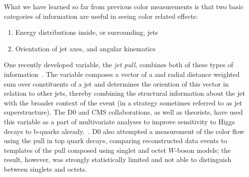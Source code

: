 What we have learned so far from previous color measurements is that two basic categories of information are useful in seeing color related effects:
%
\begin{enumerate}
\item Energy distributions inside, or surrounding, jets
\item Orientation of jet axes, and angular kinematics 
\end{enumerate}
%
One recently developed variable, the \textit{jet pull}, combines both of these types of information~\cite{Gallicchio:2010sw}. The variable composes a vector of a \pt and radial distance weighted sum over constituents of a jet and determines the oriention of this vector in relation to other jets, thereby combining the structural information about the jet with the broader context of the event (in a strategy sometimes referred to as jet superstructure). The D0 and CMS collaborations, as well as theorists, have used this variable as a part of multivariate analyses to improve sensitivity to Higgs decays to b-quarks already.~\cite{D0higgs,CMShiggspap,CMShiggspap2}. D0 also attempted a measurement of the color flow using the pull in top quark decays, comparing reconstructed data events to templates of the pull composed using singlet and octet $W$-boson models; the result, however, was strongly statistically limited and not able to distinguish between singlets and octets.

